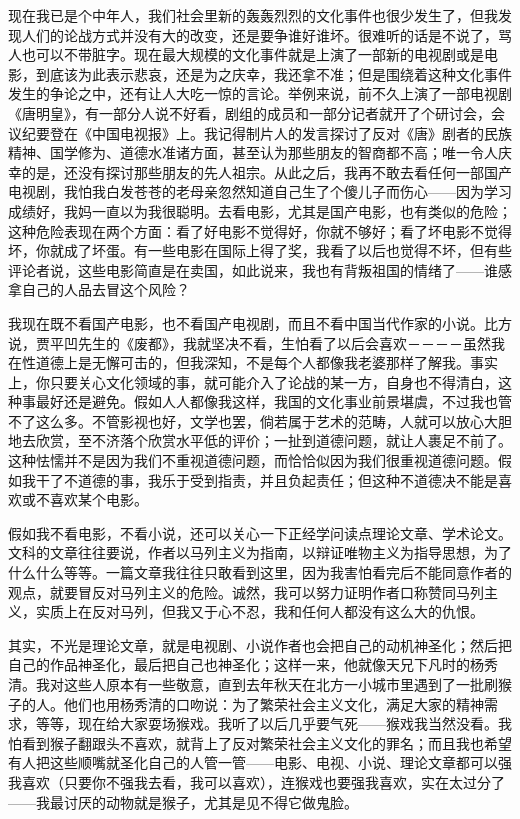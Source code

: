 现在我已是个中年人，我们社会里新的轰轰烈烈的文化事件也很少发生了，但我发现人们的论战方式并没有大的改变，还是要争谁好谁坏。很难听的话是不说了，骂人也可以不带脏字。现在最大规模的文化事件就是上演了一部新的电视剧或是电影，到底该为此表示悲哀，还是为之庆幸，我还拿不准；但是围绕着这种文化事件发生的争论之中，还有让人大吃一惊的言论。举例来说，前不久上演了一部电视剧《唐明皇》，有一部分人说不好看，剧组的成员和一部分记者就开了个研讨会，会议纪要登在《中国电视报》上。我记得制片人的发言探讨了反对《唐》剧者的民族精神、国学修为、道德水准诸方面，甚至认为那些朋友的智商都不高；唯一令人庆幸的是，还没有探讨那些朋友的先人祖宗。从此之后，我再不敢去看任何一部国产电视剧，我怕我白发苍苍的老母亲忽然知道自己生了个傻儿子而伤心——因为学习成绩好，我妈一直以为我很聪明。去看电影，尤其是国产电影，也有类似的危险；这种危险表现在两个方面：看了好电影不觉得好，你就不够好；看了坏电影不觉得坏，你就成了坏蛋。有一些电影在国际上得了奖，我看了以后也觉得不坏，但有些评论者说，这些电影简直是在卖国，如此说来，我也有背叛祖国的情绪了——谁感拿自己的人品去冒这个风险？ 

我现在既不看国产电影，也不看国产电视剧，而且不看中国当代作家的小说。比方说，贾平凹先生的《废都》，我就坚决不看，生怕看了以后会喜欢－－－－虽然我在性道德上是无懈可击的，但我深知，不是每个人都像我老婆那样了解我。事实上，你只要关心文化领域的事，就可能介入了论战的某一方，自身也不得清白，这种事最好还是避免。假如人人都像我这样，我国的文化事业前景堪虞，不过我也管不了这么多。不管影视也好，文学也罢，倘若属于艺术的范畴，人就可以放心大胆地去欣赏，至不济落个欣赏水平低的评价；一扯到道德问题，就让人裹足不前了。这种怯懦并不是因为我们不重视道德问题，而恰恰似因为我们很重视道德问题。假如我干了不道德的事，我乐于受到指责，并且负起责任；但这种不道德决不能是喜欢或不喜欢某个电影。 

假如我不看电影，不看小说，还可以关心一下正经学问读点理论文章、学术论文。文科的文章往往要说，作者以马列主义为指南，以辩证唯物主义为指导思想，为了什么什么等等。一篇文章我往往只敢看到这里，因为我害怕看完后不能同意作者的观点，就要冒反对马列主义的危险。诚然，我可以努力证明作者口称赞同马列主义，实质上在反对马列，但我又于心不忍，我和任何人都没有这么大的仇恨。 

其实，不光是理论文章，就是电视剧、小说作者也会把自己的动机神圣化；然后把自己的作品神圣化，最后把自己也神圣化；这样一来，他就像天兄下凡时的杨秀清。我对这些人原本有一些敬意，直到去年秋天在北方一小城市里遇到了一批刷猴子的人。他们也用杨秀清的口吻说：为了繁荣社会主义文化，满足大家的精神需求，等等，现在给大家耍场猴戏。我听了以后几乎要气死——猴戏我当然没看。我怕看到猴子翻跟头不喜欢，就背上了反对繁荣社会主义文化的罪名；而且我也希望有人把这些顺嘴就圣化自己的人管一管——电影、电视、小说、理论文章都可以强我喜欢（只要你不强我去看，我可以喜欢），连猴戏也要强我喜欢，实在太过分了——我最讨厌的动物就是猴子，尤其是见不得它做鬼脸。 


